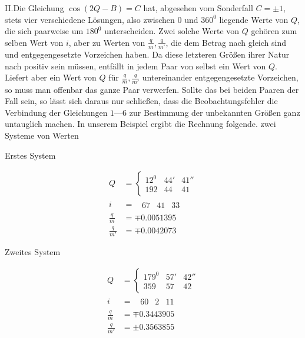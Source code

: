 II.\quad Die Gleichung $\cos(2Q-B)=C$ hat, abgesehen vom Sonderfall $C=\pm1$, stets vier verschiedene Lösungen, also zwischen $0$ und $360^0$ liegende Werte von $Q$, die sich paarweise um $180^0$ unterscheiden. Zwei solche Werte von $Q$ gehören zum selben Wert von $i$, aber zu Werten von $\frac{q}{m},\frac{q}{m'}$, die dem Betrag nach gleich sind und entgegengesetzte Vorzeichen haben. Da diese letzteren Größen ihrer Natur nach positiv sein müssen, entfällt in jedem Paar von selbst ein Wert von $Q$. Liefert aber ein Wert von $Q$ für $\frac{q}{m},\frac{q}{m'}$ untereinander entgegengesetzte Vorzeichen, so muss man offenbar das ganze Paar verwerfen. Sollte das bei beiden Paaren der Fall sein, so lässt sich daraus nur schließen, dass die Beobachtungsfehler die Verbindung der Gleichungen $1$---$6$ zur Bestimmung der unbekannten Größen ganz untauglich machen. In unserem Beispiel ergibt die Rechnung folgende. zwei Systeme von Werten
\begin{center}Erstes System\end{center}
\[
\begin{aligned}
Q&=\left\{\begin{array}{rrr}12^0&44'&41''\\192&44&41\end{array}\right.\\
i&=\phantom{\{}\begin{array}{rrr}67&41&33\end{array}\\
\frac{q}{m}&=\mp0.0051395\\
\frac{q}{m'}&=\mp0.0042073
\end{aligned}
\]
\begin{center}Zweites System\end{center}
\[
\begin{aligned}
Q&=\left\{\begin{array}{rrr}179^0&57'&42''\\359&57&42\end{array}\right.\\
i&=\phantom{\{}\begin{array}{rrr}60&2&11\end{array}\\
\frac{q}{m}&=\mp0.3443905\\
\frac{q}{m'}&=\pm0.3563855
\end{aligned}
\]

